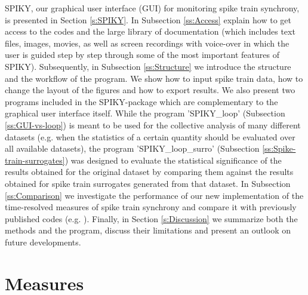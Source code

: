 \documentclass[10pt,twocolumn]{elsart5p}
\begin{document}
SPIKY, our graphical user interface (GUI) for monitoring spike train synchrony, is presented in Section \ref{s:SPIKY}. In Subsection \ref{ss:Access} explain how to get access to the codes and the large library of documentation (which includes text files, images, movies, as well as screen recordings with voice-over in which the user is guided step by step through some of the most important features of SPIKY). Subsequently, in Subsection \ref{ss:Structure} we introduce the structure and the workflow of the program. We show how to input spike train data, how to change the layout of the figures and how to export results. We also present two programs included in the SPIKY-package which are complementary to the graphical user interface itself. While the program 'SPIKY\_loop' (Subsection \ref{ss:GUI-vs-loop}) is meant to be used for the collective analysis of many different datasets (e.g. when the statistics of a certain quantity should be evaluated over all available datasets), the program 'SPIKY\_loop\_surro' (Subsection \ref{ss:Spike-train-surrogates}) was designed to evaluate the statistical significance of the results obtained for the original dataset by comparing them against the results obtained for spike train surrogates generated from that dataset. In Subsection \ref{ss:Comparison} we investigate the performance of our new implementation of the time-resolved measures of spike train synchrony and compare it with previously published codes (e.g. \citet{Rusu14}). Finally, in Section \ref{s:Discussion} we summarize both the methods and the program, discuss their limitations and present an outlook on future developments.

%
%
%
%
\section{\label{s:Measures} Measures}
\end{document}
